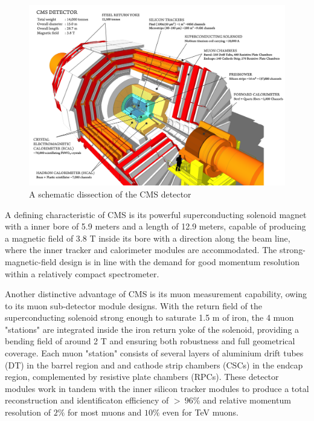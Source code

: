 \documentclass[10pt,twocolumn]{article}
\begin{document}
\begin{figure}
    \centering
    \includegraphics[width=1.0\linewidth]{images/CMS_disection_Run2.png}
    \caption{A schematic dissection of the CMS detector\cite{CMS_CUTAWAY_DIAGRAM}}
    \label{fig:CMS-disection}
\end{figure}

A defining characteristic of CMS is its powerful superconducting solenoid magnet with a inner bore of 5.9 meters and a length of 12.9 meters, capable of producing a magnetic field of 3.8 T inside its bore with a direction along the beam line, where the inner tracker and calorimeter modules are accommodated. The strong-magnetic-field design is in line with the demand for good momentum resolution within a relatively compact spectrometer.\cite{CMS_JINST_2008}

Another distinctive advantage of CMS is its muon measurement capability, owing to its muon sub-detector module designs. With the return field of the superconducting solenoid strong enough to saturate 1.5 m of iron, the 4 muon "stations" are integrated inside the iron return yoke of the solenoid, providing a bending field of around 2 T and ensuring both robustness and full geometrical coverage. Each muon "station" consists of several layers of aluminium drift tubes (DT) in the barrel region and and cathode strip chambers (CSCs) in the endcap region, complemented by resistive plate chambers (RPCs). These detector modules work in tandem with the inner silicon tracker modules to produce a total reconstruction and identificaton efficiency of $> ~ 96\%$ and relative momentum resolution of $2\%$ for most muons and $10\%$ even for TeV muons.\cite{CMS_MUON_PERF_13TEV}
\end{document}
